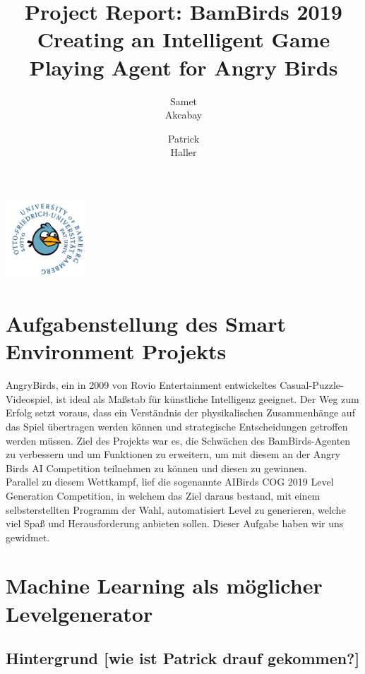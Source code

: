 \documentclass[11pt]{article}
\begin{document}
	\begin{titlepage}
		\begin{center}
			\title{Project Report: BamBirds 2019\\
				{\small Creating  an Intelligent Game Playing Agent for Angry Birds}}
			\includegraphics[width=3cm,height=3cm]{img/logo.png}
			\author{Samet\\Akcabay\and
			Patrick\\Haller}
		\end{center}
	\end{titlepage}
\maketitle
\newpage
\tableofcontents
\newpage
\section{Aufgabenstellung des Smart Environment Projekts}
AngryBirds, ein in 2009 von Rovio Entertainment entwickeltes Casual-Puzzle-Videospiel, ist ideal als Maßstab für künstliche Intelligenz geeignet. Der Weg zum Erfolg setzt voraus, dass ein Verständnis der physikalischen Zusammenhänge auf das Spiel übertragen werden können und strategische Entscheidungen getroffen werden müssen. Ziel des Projekts war es, die Schwächen des BamBirds-Agenten zu verbessern und um Funktionen zu erweitern, um mit diesem an der Angry Birds AI Competition teilnehmen zu können und diesen zu gewinnen.\\Parallel zu diesem Wettkampf, lief die sogenannte AIBirds COG 2019 Level Generation Competition, in welchem das Ziel daraus bestand, mit einem selbsterstellten Programm der Wahl, automatisiert Level zu generieren, welche viel Spaß und Herausforderung anbieten sollen. Dieser Aufgabe haben wir uns gewidmet.
\section{Machine Learning als möglicher Levelgenerator}
\subsection{Hintergrund [wie ist Patrick drauf gekommen?]}
\end{document}
